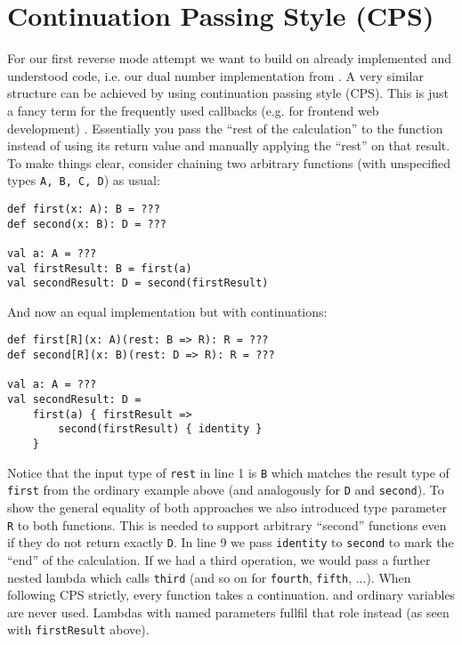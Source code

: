 \section{Continuation Passing Style (CPS)}


For our first reverse mode attempt \todowording we want to build on already implemented and understood code, i.e. our dual number implementation from . A very similar structure can be achieved by using continuation passing style (CPS). This is just a fancy term \todowording for the frequently used callbacks (e.g. for frontend web development) . Essentially you pass the ``rest of the calculation'' to the function instead of using its return value and manually applying the ``rest'' on that result. To make things clear, \todopunctuation consider chaining two arbitrary functions (with unspecified types \lstinline{A, B, C, D}) as usual:
\begin{lstlisting}
def first(x: A): B = ???
def second(x: B): D = ???

val a: A = ???
val firstResult: B = first(a)
val secondResult: D = second(firstResult)
\end{lstlisting}
And now an equal implementation but with continuations:
\begin{lstlisting}
def first[R](x: A)(rest: B => R): R = ???
def second[R](x: B)(rest: D => R): R = ???

val a: A = ???
val secondResult: D = 
    first(a) { firstResult => 
        second(firstResult) { identity }
    }
\end{lstlisting}
Notice that the input type of \lstinline{rest} in line 1 is \lstinline{B} which matches the result type of \lstinline{first} from the ordinary example above (and analogously for \lstinline{D} and \lstinline{second}). To show the general equality of both approaches we also introduced type parameter \lstinline{R} to both functions. This is needed to support arbitrary ``second'' functions even if they do not return exactly \lstinline{D}. In line 9 we pass \lstinline{identity} to \lstinline{second} to mark the ``end'' of the calculation. If we had a third operation, we would pass a further nested lambda which calls \lstinline{third} (and so on for \lstinline{fourth}, \lstinline{fifth}, ...). When following CPS strictly, every function takes a continuation. and ordinary variables are never used. Lambdas with named parameters fullfil that role instead (as seen with \lstinline{firstResult} above).

